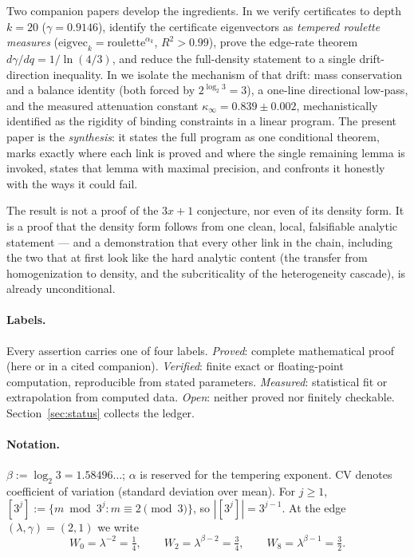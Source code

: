 \documentclass[11pt]{article}
\theoremstyle{definition}
\theoremstyle{remark}
\newcommand{\CV}{\mathrm{CV}}
\newcommand{\lam}{\lambda}
\newcommand{\gam}{\gamma}
\newcommand{\bet}{\beta}
\newcommand{\kap}{\kappa}
\begin{document}
Two companion papers develop the ingredients. In \cite{Temp26} we verify
certificates to depth $k = 20$ ($\gam = 0.9146$), identify the certificate
eigenvectors as \emph{tempered roulette measures}
($\mathrm{eigvec}_k = \mathrm{roulette}^{\alpha_k}$, $R^2 > 0.99$), prove the
edge-rate theorem $d\gam/dq = 1/\ln(4/3)$, and reduce the full-density
statement to a single drift-direction inequality. In \cite{Drift26} we isolate
the mechanism of that drift: mass conservation and a balance identity (both
forced by $2^{\log_2 3} = 3$), a one-line directional low-pass, and the
measured attenuation constant $\kap_\infty = 0.839 \pm 0.002$, mechanistically
identified as the rigidity of binding constraints in a linear program. The
present paper is the \emph{synthesis}: it states the full program as one
conditional theorem, marks exactly where each link is proved and where the
single remaining lemma is invoked, states that lemma with maximal precision,
and confronts it honestly with the ways it could fail.

The result is not a proof of the $3x+1$ conjecture, nor even of its density
form. It is a proof that the density form follows from one clean, local,
falsifiable analytic statement --- and a demonstration that every other link in
the chain, including the two that at first look like the hard analytic content
(the transfer from homogenization to density, and the subcriticality of the
heterogeneity cascade), is already unconditional.

\paragraph{Labels.} Every assertion carries one of four labels.
\emph{Proved}: complete mathematical proof (here or in a cited companion).
\emph{Verified}: finite exact or floating-point computation, reproducible from
stated parameters. \emph{Measured}: statistical fit or extrapolation from
computed data. \emph{Open}: neither proved nor finitely checkable.
Section~\ref{sec:status} collects the ledger.

\paragraph{Notation.}
$\bet := \log_2 3 = 1.58496\ldots$; $\alpha$ is reserved for the tempering
exponent. $\CV$ denotes coefficient of variation (standard deviation over
mean). For $j \geq 1$, $[3^j] := \{ m \bmod 3^j : m \equiv 2 \pmod 3\}$, so
$|[3^j]| = 3^{j-1}$. At the edge $(\lam, \gam) = (2, 1)$ we write
\begin{equation}
W_0 = \lam^{-2} = \tfrac14, \qquad
W_2 = \lam^{\bet-2} = \tfrac34, \qquad
W_8 = \lam^{\bet-1} = \tfrac32 .
\label{eq:weights}
\end{equation}
\end{document}
